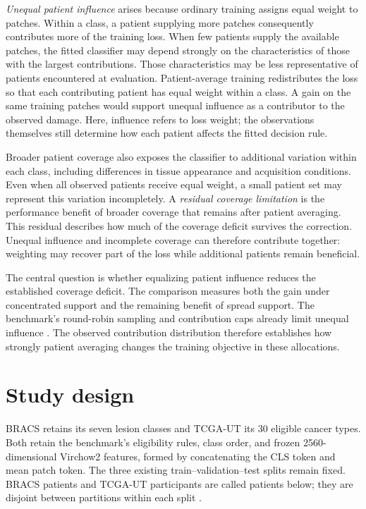 \documentclass[11pt]{article}
\begin{document}
\emph{Unequal patient influence} arises because ordinary training assigns equal weight to patches. Within a class, a patient supplying more patches consequently contributes more of the training loss. When few patients supply the available patches, the fitted classifier may depend strongly on the characteristics of those with the largest contributions. Those characteristics may be less representative of patients encountered at evaluation. Patient-average training redistributes the loss so that each contributing patient has equal weight within a class. A gain on the same training patches would support unequal influence as a contributor to the observed damage. Here, influence refers to loss weight; the observations themselves still determine how each patient affects the fitted decision rule.

Broader patient coverage also exposes the classifier to additional variation within each class, including differences in tissue appearance and acquisition conditions. Even when all observed patients receive equal weight, a small patient set may represent this variation incompletely. A \emph{residual coverage limitation} is the performance benefit of broader coverage that remains after patient averaging. This residual describes how much of the coverage deficit survives the correction. Unequal influence and incomplete coverage can therefore contribute together: weighting may recover part of the loss while additional patients remain beneficial.

The central question is whether equalizing patient influence reduces the established coverage deficit. The comparison measures both the gain under concentrated support and the remaining benefit of spread support. The benchmark's round-robin sampling and contribution caps already limit unequal influence \citep{queisler2026benchmarkProtocol}. The observed contribution distribution therefore establishes how strongly patient averaging changes the training objective in these allocations.

\section{Study design}
\label{sec:design}
BRACS retains its seven lesion classes and TCGA-UT its 30 eligible cancer types. Both retain the benchmark's eligibility rules, class order, and frozen 2560-dimensional Virchow2 features, formed by concatenating the CLS token and mean patch token. The three existing train--validation--test splits remain fixed. BRACS patients and TCGA-UT participants are called patients below; they are disjoint between partitions within each split \citep{queisler2026benchmarkProtocol}.
\end{document}
